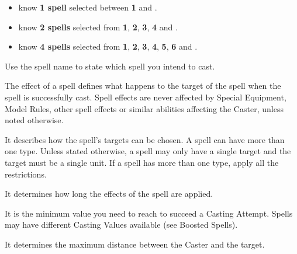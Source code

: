
\begin{itemize}[label={-}]
\item \textbf{\wizardapprentices} know \textbf{1 spell} selected between \textbf{1} and \textbf{\hereditaryspellnumber}.
\item \textbf{\wizardadepts} know \textbf{2 spells} selected from \textbf{1}, \textbf{2}, \textbf{3}, \textbf{4} and \textbf{\hereditaryspellnumber}.
\item \textbf{\wizardmasters} know \textbf{4 spells} selected from \textbf{1}, \textbf{2}, \textbf{3}, \textbf{4}, \textbf{5}, \textbf{6} and \textbf{\hereditaryspellnumber}.
\end{itemize}

\vspace*{5pt}

\begin{multicols}{3}\raggedcolumns

\begin{center}

Use the spell name to state which spell you intend to cast.

\basicsubsubtitle{\spellsEffect}

The effect of a spell defines what happens to the target of the spell when the spell is successfully cast. Spell effects are never affected by Special Equipment, Model Rules, other spell effects or similar abilities affecting the Caster, unless noted otherwise.
\end{center}

\vspace*{\fill}\columnbreak

\begin{center}
\basicsubsubtitle{\spellsType}

It describes how the spell's targets can be chosen. A spell can have more than one type. Unless stated otherwise, a spell may only have a single target and the target must be a single unit. If a spell has more than one type, apply all the restrictions.

\basicsubsubtitle{\spellsDuration}

It determines how long the effects of the spell are applied.
\end{center}
\vspace*{\fill}\columnbreak

\begin{center}
\basicsubsubtitle{\spellsCastingValue}

It is the minimum value you need to reach to succeed a Casting Attempt. Spells may have different Casting Values available (see Boosted Spells).

\basicsubsubtitle{\spellsRange}

It determines the maximum distance between the Caster and the target.
\end{center}
\vspace*{\fill}
\end{multicols}

